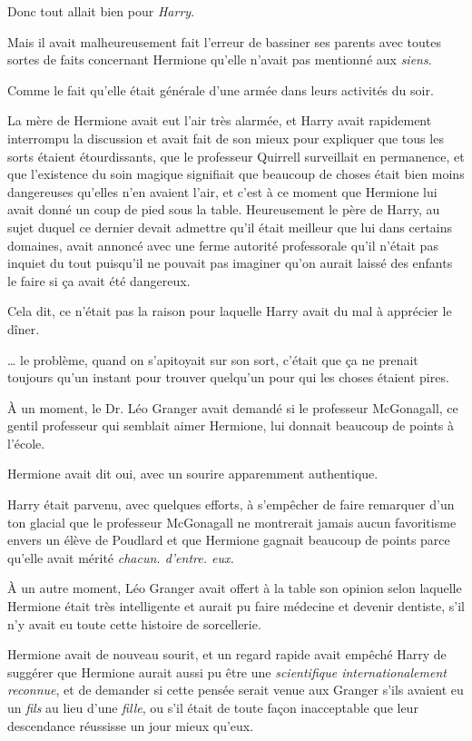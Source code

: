 Donc tout allait bien pour \emph{Harry}.

Mais il avait malheureusement fait l'erreur de bassiner ses parents avec toutes sortes de faits concernant Hermione qu'elle n'avait pas mentionné aux \emph{siens}.

Comme le fait qu'elle était générale d'une armée dans leurs activités du soir.

La mère de Hermione avait eut l'air très alarmée, et Harry avait rapidement interrompu la discussion et avait fait de son mieux pour expliquer que tous les sorts étaient étourdissants, que le professeur Quirrell surveillait en permanence, et que l'existence du soin magique signifiait que beaucoup de choses était bien moins dangereuses qu'elles n'en avaient l'air, et c'est à ce moment que Hermione lui avait donné un coup de pied sous la table. Heureusement le père de Harry, au sujet duquel ce dernier devait admettre qu'il était meilleur que lui dans certains domaines, avait annoncé avec une ferme autorité professorale qu'il n'était pas inquiet du tout puisqu'il ne pouvait pas imaginer qu'on aurait laissé des enfants le faire si ça avait été dangereux.

Cela dit, ce n'était pas la raison pour laquelle Harry avait du mal à apprécier le dîner.

… le problème, quand on s'apitoyait sur son sort, c'était que ça ne prenait toujours qu'un instant pour trouver quelqu'un pour qui les choses étaient pires.

À un moment, le Dr. Léo Granger avait demandé si le professeur McGonagall, ce gentil professeur qui semblait aimer Hermione, lui donnait beaucoup de points à l'école.

Hermione avait dit oui, avec un sourire apparemment authentique.

Harry était parvenu, avec quelques efforts, à s'empêcher de faire remarquer d'un ton glacial que le professeur McGonagall ne montrerait jamais aucun favoritisme envers un élève de Poudlard et que Hermione gagnait beaucoup de points parce qu'elle avait mérité \emph{chacun. d'entre. eux.}

À un autre moment, Léo Granger avait offert à la table son opinion selon laquelle Hermione était très intelligente et aurait pu faire médecine et devenir dentiste, s'il n'y avait eu toute cette histoire de sorcellerie.

Hermione avait de nouveau sourit, et un regard rapide avait empêché Harry de suggérer que Hermione aurait aussi pu être une \emph{scientifique internationalement reconnue}, et de demander si cette pensée serait venue aux Granger s'ils avaient eu un \emph{fils} au lieu d'une \emph{fille}, ou s'il était de toute façon inacceptable que leur descendance réussisse un jour mieux qu'eux.

